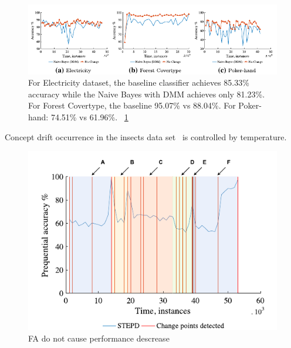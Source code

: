 \documentclass[12 pt]{article}
\begin{document}
  \begin{figure}[htb!]
    \centering
    \includegraphics[height=0.15\textheight]{images_cropped/souza_fig7}
    \caption{
  For Electricity dataset, the baseline classifier achieves 85.33\% accuracy while the Naive Bayes with DMM achieves only 81.23\%. For Forest Covertype, the baseline 95.07\% vs 88.04\%. For Poker-hand: 74.51\% vs 61.96\%.
  ~\ref{fig:fig7_souza}
    }\label{fig:fig7_souza}
  \end{figure}

Concept drift occurrence in the insects data set~\cite{SouzaRMB20} is controlled by temperature.
  \begin{figure}[htb!]
    \centering
    \includegraphics[height=0.5\textheight]{images_cropped/souza_fig28}
    \caption{FA do not cause performance descrease}
    \label{fig:fig28_souza}
  \end{figure}


  
  
\end{document}
